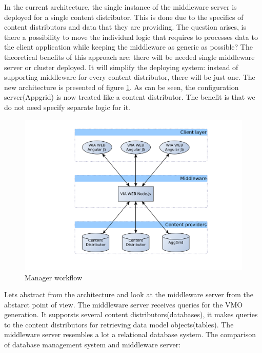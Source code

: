 In the current architecture, the single instance of the middleware server is deployed for a single content distributor. This is done due to the specifics of content distributors and data that they are providing. The question arises, is there a possibility to move the individual logic that requires to processes data to the client application while keeping the middleware as generic as possible? The theoretical benefits of this approach are: there will be needed single middleware server or cluster deployed. It will simplify the deploying system: instead of supporting middleware for every content distributor, there will be just one. The new architecture is presented of figure \ref{fig:arch_overview_new}. As can be seen, the configuration server(Appgrid) is now treated like a content distributor. The benefit is that we do not need specify separate logic for it. 

\begin{figure}[h]
    \centering
	\includegraphics[width=\textwidth]{images/thesis_global_architecture_new.png}
    \caption{Manager workflow}
    \label{fig:arch_overview_new}
\end{figure}

Lets abstract from the architecture and look at the middleware server from the abstarct point of view.
The middleware server receives queries for the VMO generation. It supporsts several content distributors(databases), it makes queries to the content distributors for retrieving data model objects(tables). The middleware server resembles a lot a relational database system. The comparison of database management system and middleware server:


